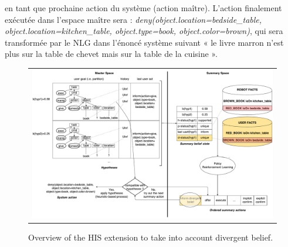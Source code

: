 \documentclass[a4paper,11pt,twoside]{StyleThese}
\begin{document}
en tant que prochaine action du système (action maître). L’action finalement exécutée
dans l’espace maître sera : \textit{deny(object.location=bedside\_table, object.location=kitchen\_table,
object.type=book, object.color=brown)}, qui sera transformée par le NLG dans l’énoncé système suivant « le livre marron n’est plus sur la table de chevet mais sur la table de la cuisine ».

\clearpage

\begin{figure}
 \centering
 \begin{tabular}{c}
  \includegraphics[width=1.0\textwidth]{img/MaRDHIS.pdf}
 \end{tabular}
 \caption{Overview of the HIS extension to take into account divergent belief.}
 \label{fig:overview-mardhis}
\end{figure}


\clearpage
\end{document}
